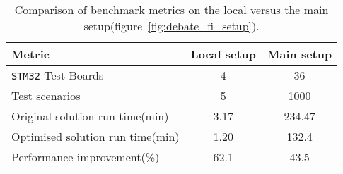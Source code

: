 \begin{table}[H]
	\centering
	\begin{tabular}{@{}lcc@{}} %
		\toprule
		\textbf{Metric} & \textbf{Local setup} & \textbf{Main setup} \\
		\midrule
		\texttt{STM32} Test Boards & 4 & 36 \\
		Test scenarios & 5 & 1000 \\
		Original solution run time(min) & 3.17 & 234.47 \\
		Optimised solution run time(min) & 1.20 & 132.4 \\
		Performance improvement(\%) & 62.1 & 43.5 \\
		\bottomrule
	\end{tabular}
	\caption{Comparison of benchmark metrics on the local versus the main setup(figure~\ref{fig:debate_fi_setup}).}
	\label{tab:debate_metrics}
\end{table}